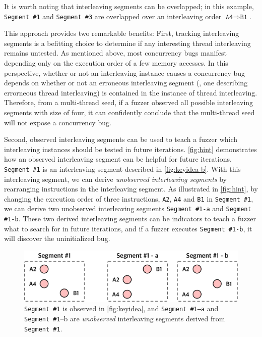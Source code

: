 %
It is worth noting that interleaving segments can be overlapped; in
this example, \texttt{Segment \#1} and \texttt{Segment \#3} are
overlapped over an interleaving order
$\texttt{A4} \Rightarrow \texttt{B1}$.




%
This approach provides two remarkable benefits:
%
First, tracking interleaving segments is a befitting choice to
determine if any interesting thread interleaving remains untested.
%
As mentioned above, most concurrency bugs manifest depending only on
the execution order of a few memory accesses.
%
In this perspective, whether or not an interleaving instance causes a
concurrency bug depends on whether or not an erroneous interleaving
segment (\ie, one describing errorneous thread interleaving) is
contained in the instance of thread interleaving.
%
Therefore, from a multi-thread seed, if a fuzzer observed all possible
interleaving segments with size of four, it can confidently conclude
that the multi-thread seed will not expose a concurrency bug.
%



Second, observed interleaving segments can be used to teach a fuzzer
which interleaving instances should be tested in future iterations.
%
\autoref{fig:hint} demonstrates how an observed interleaving segment
can be helpful for future iterations.
%
\texttt{Segment \#1} is an interleaving segment described in
\autoref{fig:keyidea-b}.
%
With this interleaving segment, we can derive \textit{unobserved
  interleaving segments} by rearranging instructions in the
interleaving segment.
%
As illustrated in \autoref{fig:hint}, by changing the execution order
of three instructions, \texttt{A2}, \texttt{A4} and \texttt{B1} in
\texttt{Segment \#1}, we can derive two unobserved interleaving
segments \texttt{Segment \#1-a} and \texttt{Segment \#1-b}.
%
These two derived interleaving segments can be indicators to teach a
fuzzer what to search for in future iterations, and if a fuzzer
executes \texttt{Segment \#1-b}, it will discover the uninitialized
bug.
%
\begin{figure}[t]
  \centering
  \includegraphics[width=0.9\linewidth]{fig/hint.pdf}
  \caption{\texttt{Segment \#1} is observed in \autoref{fig:keyidea},
    and \texttt{Segment \#1--a} and \texttt{Segment \#1}--b are
    \textit{unobserved} interleaving segments derived from
    \texttt{Segment \#1}.}
  \label{fig:hint}
\end{figure}
%



